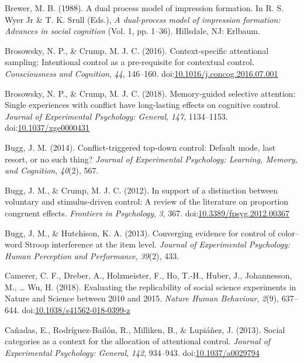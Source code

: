 \documentclass[english,,man,floatsintext]{apa6}
\begin{document}
\leavevmode\hypertarget{ref-brewer_dual_1988}{}%
Brewer, M. B. (1988). A dual process model of impression formation. In R. S. Wyer Jr \& T. K. Srull (Eds.), \emph{A dual-process model of impression formation: Advances in social cognition} (Vol. 1, pp. 1--36). Hillsdale, NJ: Erlbaum.

\leavevmode\hypertarget{ref-brosowsky_context-specific_2016}{}%
Brosowsky, N. P., \& Crump, M. J. C. (2016). Context-specific attentional sampling: Intentional control as a pre-requisite for contextual control. \emph{Consciousness and Cognition}, \emph{44}, 146--160. doi:\href{https://doi.org/10.1016/j.concog.2016.07.001}{10.1016/j.concog.2016.07.001}

\leavevmode\hypertarget{ref-brosowsky_memory-guided_2018}{}%
Brosowsky, N. P., \& Crump, M. J. C. (2018). Memory-guided selective attention: Single experiences with conflict have long-lasting effects on cognitive control. \emph{Journal of Experimental Psychology: General}, \emph{147}, 1134--1153. doi:\href{https://doi.org/10.1037/xge0000431}{10.1037/xge0000431}

\leavevmode\hypertarget{ref-bugg_conflict-triggered_2014}{}%
Bugg, J. M. (2014). Conflict-triggered top-down control: Default mode, last resort, or no such thing? \emph{Journal of Experimental Psychology: Learning, Memory, and Cognition}, \emph{40}(2), 567.

\leavevmode\hypertarget{ref-bugg_support_2012}{}%
Bugg, J. M., \& Crump, M. J. C. (2012). In support of a distinction between voluntary and stimulus-driven control: A review of the literature on proportion congruent effects. \emph{Frontiers in Psychology}, \emph{3}, 367. doi:\href{https://doi.org/10.3389/fpsyg.2012.00367}{10.3389/fpsyg.2012.00367}

\leavevmode\hypertarget{ref-bugg_converging_2013}{}%
Bugg, J. M., \& Hutchison, K. A. (2013). Converging evidence for control of color--word Stroop interference at the item level. \emph{Journal of Experimental Psychology: Human Perception and Performance}, \emph{39}(2), 433.

\leavevmode\hypertarget{ref-camerer_evaluating_2018}{}%
Camerer, C. F., Dreber, A., Holzmeister, F., Ho, T.-H., Huber, J., Johannesson, M., \ldots{} Wu, H. (2018). Evaluating the replicability of social science experiments in Nature and Science between 2010 and 2015. \emph{Nature Human Behaviour}, \emph{2}(9), 637--644. doi:\href{https://doi.org/10.1038/s41562-018-0399-z}{10.1038/s41562-018-0399-z}

\leavevmode\hypertarget{ref-canadas_social_2013}{}%
Cañadas, E., Rodríguez-Bailón, R., Milliken, B., \& Lupiáñez, J. (2013). Social categories as a context for the allocation of attentional control. \emph{Journal of Experimental Psychology: General}, \emph{142}, 934--943. doi:\href{https://doi.org/10.1037/a0029794}{10.1037/a0029794}
\end{document}
